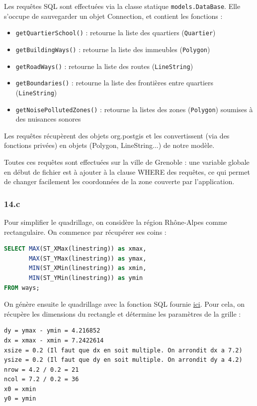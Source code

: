 \documentclass[12pt,a4paper]{article}
\begin{document}
Les requêtes SQL sont effectuées via la classe statique \verb?models.DataBase?. Elle s'occupe de sauvegarder un objet Connection, et contient les fonctions :
\begin{itemize}
	\item \verb?getQuartierSchool()? : retourne la liste des quartiers (\verb?Quartier?)
	\item \verb?getBuildingWays()? : retourne la liste des immeubles (\verb?Polygon?)
	\item \verb?getRoadWays()? : retourne la liste des routes (\verb?LineString?)
    \item \verb?getBoundaries()? : retourne la liste des frontières entre quartiers (\verb?LineString?)
    \item \verb?getNoisePollutedZones()? : retourne la listes des zones (\verb?Polygon?) soumises à des nuisances sonores
\end{itemize}

Les requêtes récupèrent des objets org.postgis et les convertissent (via des fonctions privées) en objets (Polygon, LineString...) de notre modèle.

Toutes ces requêtes sont effectuées sur la ville de Grenoble : une variable globale en début de fichier est à ajouter à la clause WHERE des requêtes, ce qui permet de changer facilement les coordonnées de la zone couverte par l'application.

\subsubsection*{14.c}

Pour simplifier le quadrillage, on considère la région Rhône-Alpes comme rectangulaire.
On commence par récupérer ses coins :

\begin{lstlisting}[language=SQL]
SELECT MAX(ST_XMax(linestring)) as xmax,
       MAX(ST_YMax(linestring)) as ymax,
       MIN(ST_XMin(linestring)) as xmin,
       MIN(ST_YMin(linestring)) as ymin
FROM ways;
\end{lstlisting}

On génère ensuite le quadrillage avec la fonction SQL fournie \href{https://gis.stackexchange.com/a/16390}{ici}.
Pour cela, on récupère les dimensions du rectangle et détermine les paramètres
de la grille :

\begin{lstlisting}
dy = ymax - ymin = 4.216852
dx = xmax - xmin = 7.2422614
xsize = 0.2 (Il faut que dx en soit multiple. On arrondit dx a 7.2)
ysize = 0.2 (Il faut que dy en soit multiple. On arrondit dy a 4.2)
nrow = 4.2 / 0.2 = 21
ncol = 7.2 / 0.2 = 36
x0 = xmin
y0 = ymin
\end{lstlisting}
\end{document}
